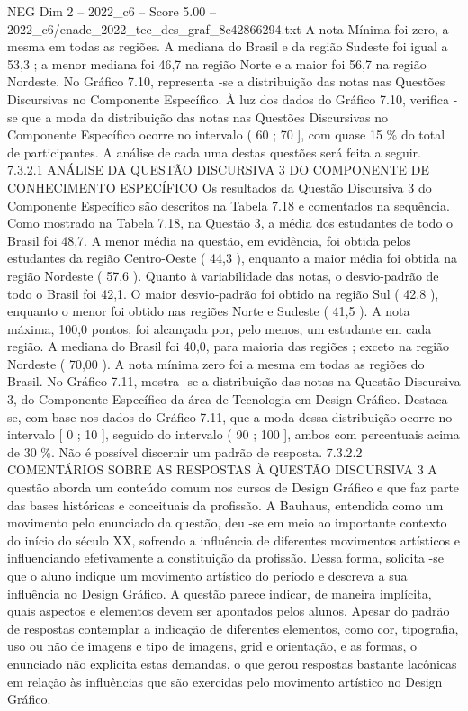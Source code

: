 \begin{textsample}{NEG Dim 2 – 2022\_c6 – Score 5.00 – 2022\_c6/enade\_2022\_tec\_des\_graf\_8c42866294.txt}
A nota Mínima foi zero, a mesma em todas as regiões.
A mediana do Brasil e da região Sudeste foi igual a 53,3 ; a menor mediana foi 46,7 na região Norte e a maior foi 56,7 na região Nordeste.
No Gráfico 7.10, representa -se a distribuição das notas nas Questões Discursivas no Componente Específico.
À luz dos dados do Gráfico 7.10, verifica -se que a moda da distribuição das notas nas Questões Discursivas no Componente Específico ocorre no intervalo ( 60 ; 70 ], com quase 15 \% do total de participantes.
A análise de cada uma destas questões será feita a seguir. 7.3.2.1 ANÁLISE DA QUESTÃO DISCURSIVA 3 DO COMPONENTE DE CONHECIMENTO ESPECÍFICO Os resultados da Questão Discursiva 3 do Componente Específico são descritos na Tabela 7.18 e comentados na sequência.
Como mostrado na Tabela 7.18, na Questão 3, a média dos estudantes de todo o Brasil foi 48,7.
A menor média na questão, em evidência, foi obtida pelos estudantes da região Centro-Oeste ( 44,3 ), enquanto a maior média foi obtida na região Nordeste ( 57,6 ).
Quanto à variabilidade das notas, o desvio-padrão de todo o Brasil foi 42,1.
O maior desvio-padrão foi obtido na região Sul ( 42,8 ), enquanto o menor foi obtido nas regiões Norte e Sudeste ( 41,5 ).
A nota máxima, 100,0 pontos, foi alcançada por, pelo menos, um estudante em cada região.
A mediana do Brasil foi 40,0, para maioria das regiões ; exceto na região Nordeste ( 70,00 ).
A nota mínima zero foi a mesma em todas as regiões do Brasil.
No Gráfico 7.11, mostra -se a distribuição das notas na Questão Discursiva 3, do Componente Específico da área de Tecnologia em Design Gráfico.
Destaca -se, com base nos dados do Gráfico 7.11, que a moda dessa distribuição ocorre no intervalo [ 0 ; 10 ], seguido do intervalo ( 90 ; 100 ], ambos com percentuais acima de 30 \%.
Não é possível discernir um padrão de resposta. 7.3.2.2 COMENTÁRIOS SOBRE AS RESPOSTAS À QUESTÃO DISCURSIVA 3 A questão aborda um conteúdo comum nos cursos de Design Gráfico e que faz parte das bases históricas e conceituais da profissão.
A Bauhaus, entendida como um movimento pelo enunciado da questão, deu -se em meio ao importante contexto do início do século XX, sofrendo a influência de diferentes movimentos artísticos e influenciando efetivamente a constituição da profissão.
Dessa forma, solicita -se que o aluno indique um movimento artístico do período e descreva a sua influência no Design Gráfico.
A questão parece indicar, de maneira implícita, quais aspectos e elementos devem ser apontados pelos alunos.
Apesar do padrão de respostas contemplar a indicação de diferentes elementos, como cor, tipografia, uso ou não de imagens e tipo de imagens, grid e orientação, e as formas, o enunciado não explicita estas demandas, o que gerou respostas bastante lacônicas em relação às influências que são exercidas pelo movimento artístico no Design Gráfico.

\end{textsample}
